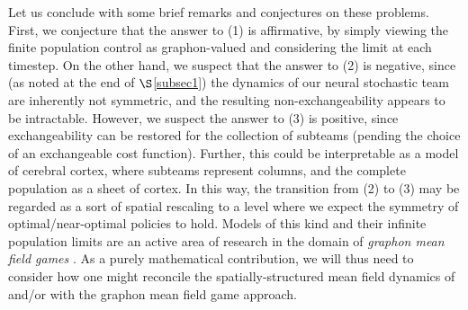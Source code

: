 \documentclass[12pt, oneside]{report}
\newcommand{\mbb}[1]{\mathbb{#1}}
\newcommand{\1}[1]{\mathbbm{1}_{\{#1\}}}
\newcommand{\mc}[1]{\mathcal{#1}}
\theoremstyle{definition}
\begin{document}
\indent Let us conclude with some brief remarks and conjectures on these problems. First, we conjecture that the answer to (1) is affirmative, by simply viewing the finite population control as graphon-valued and considering the limit at each timestep.
On the other hand, we suspect that the answer to (2) is negative, since (as noted at the end of $\S$\ref{subsec1}) the dynamics of our neural stochastic team are inherently not symmetric, and the resulting non-exchangeability appears to be intractable. However, we suspect the answer to (3) is positive,
since exchangeability can be restored for the collection of subteams (pending the choice of an exchangeable cost function). Further, this could be interpretable as a model of cerebral cortex, where subteams represent columns, and the complete population as
a sheet of cortex. In this way, the transition from (2) to (3) may be regarded as a sort of spatial rescaling to a level where we expect the symmetry of optimal/near-optimal policies to hold. Models of this kind and their infinite population limits are an active area of research in the domain of \textit{graphon mean field games} \cite{Caines_Huang_2021}. As a purely mathematical contribution, we will thus need to consider how one might reconcile the spatially-structured
mean field dynamics of \cite{Jabin_Zhou_2023} and/or \cite{Jabin_Schmutz_Zhou_2024} with the graphon mean field game approach.
\end{document}
